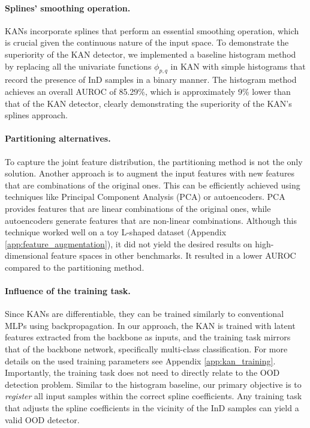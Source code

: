 \paragraph{Splines' smoothing operation.}
KANs incorporate splines that perform an essential smoothing operation, which is crucial given the continuous nature of the input space. 
To demonstrate the superiority of the KAN detector, we implemented a baseline histogram method by replacing all the univariate functions $\phi_{p,q}$ in KAN with simple histograms that record the presence of InD samples in a binary manner. 
The histogram method achieves an overall AUROC of 85.29\%, which is approximately 9\% lower than that of the KAN detector, clearly demonstrating the superiority of the KAN's splines approach.

\paragraph{Partitioning alternatives.}
To capture the joint feature distribution, the partitioning method is not the only solution.
Another approach is to augment the input features with new features that are combinations of the original ones. 
This can be efficiently achieved using techniques like Principal Component Analysis (PCA) or autoencoders. 
PCA provides features that are linear combinations of the original ones, while autoencoders generate features that are non-linear combinations.
Although this technique worked well on a toy L-shaped dataset (Appendix \ref{app:feature_augmentation}), it did not yield the desired results on high-dimensional feature spaces in other benchmarks. 
It resulted in a lower AUROC compared to the partitioning method.

\paragraph{Influence of the training task.}
Since KANs are differentiable, they can be trained similarly to conventional MLPs using backpropagation. 
In our approach, the KAN is trained with latent features extracted from the backbone as inputs, and the training task mirrors that of the backbone network, specifically multi-class classification. 
For more details on the used training parameters see Appendix \ref{app:kan_training}.
Importantly, the training task does not need to directly relate to the OOD detection problem.
Similar to the histogram baseline, our primary objective is to \textit{register} all input samples within the correct spline coefficients. 
Any training task that adjusts the spline coefficients in the vicinity of the InD samples can yield a valid OOD detector. 

